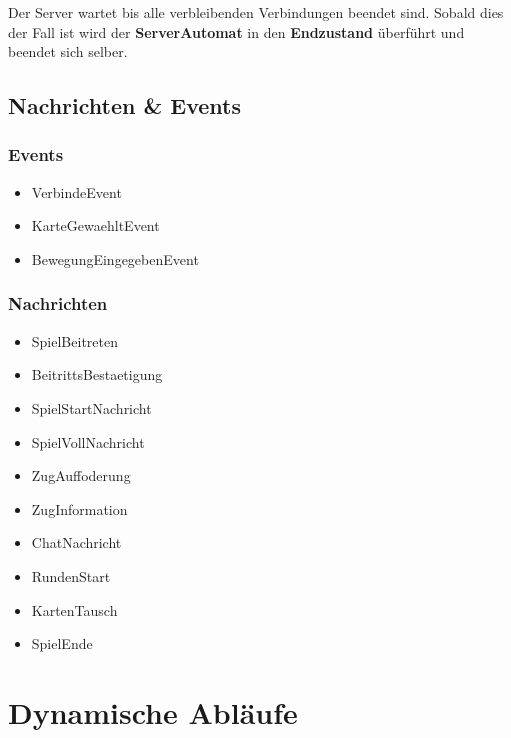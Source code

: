 \documentclass[12pt,halfparskip]{scrartcl}
\begin{document}
Der Server wartet bis alle verbleibenden Verbindungen beendet sind. Sobald dies der Fall ist wird der \textbf{ServerAutomat} in den \textbf{Endzustand} überführt und beendet sich selber.

\clearpage
\subsection{Nachrichten \& Events}
\label{sub:nachrichten_und_events}


\subsubsection{Events}
\label{ssub:events}

\begin{itemize}
	\item VerbindeEvent
	\item KarteGewaehltEvent
	\item BewegungEingegebenEvent
\end{itemize}

\subsubsection{Nachrichten}
\label{ssub:nachrichten}

\begin{itemize}
	\item SpielBeitreten
	\item BeitrittsBestaetigung
	\item SpielStartNachricht
	\item SpielVollNachricht
	\item ZugAuffoderung
	\item ZugInformation
	\item ChatNachricht
	\item RundenStart
	\item KartenTausch
	\item SpielEnde
\end{itemize}

\clearpage
\section{Dynamische Abläufe}
\label{dynamische_ablauefe}
\end{document}
